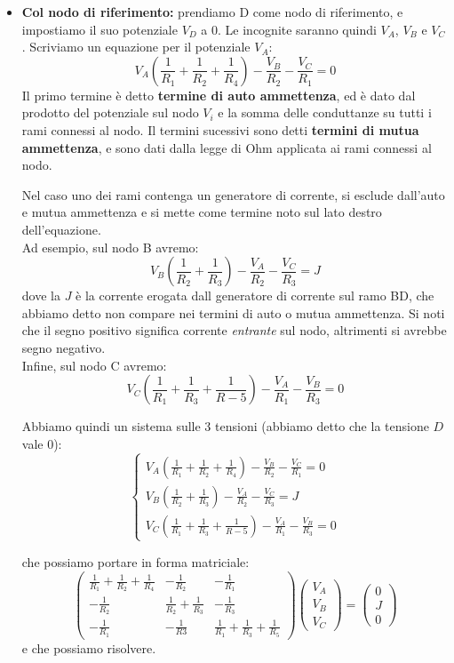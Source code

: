 \documentclass[a4paper,11pt]{article}
\begin{document}
\begin{itemize}
	\item \textbf{Col nodo di riferimento:} prendiamo D come nodo di riferimento, e impostiamo il suo potenziale $V_D$ a $0$. 
Le incognite saranno quindi $V_A$, $V_B$ e $V_C$.
Scriviamo un equazione per il potenziale $V_A$:
$$ V_A\left( \frac{1}{R_1} + \frac{1}{R_2} + \frac{1}{R_4} \right) - \frac{V_B}{R_2} - \frac{V_C}{R_1} = 0 $$
Il primo termine è detto \textbf{termine di auto ammettenza}, ed è dato dal prodotto del potenziale sul nodo $V_i$ e la somma delle conduttanze su tutti i rami connessi al nodo.
Il termini sucessivi sono detti \textbf{termini di mutua ammettenza}, e sono dati dalla legge di Ohm applicata ai rami connessi al nodo.

Nel caso uno dei rami contenga un generatore di corrente, si esclude dall'auto e mutua ammettenza e si mette come termine noto sul lato destro dell'equazione. \\
Ad esempio, sul nodo B avremo:
$$ V_B \left( \frac{1}{R_2} + \frac{1}{R_3} \right) - \frac{V_A}{R_2} - \frac{V_C}{R_3} = J $$
dove la $J$ è la corrente erogata dall generatore di corrente sul ramo BD, che abbiamo detto non compare nei termini di auto o mutua ammettenza. 
Si noti che il segno positivo significa corrente \textit{entrante} sul nodo, altrimenti si avrebbe segno negativo. \\
Infine, sul nodo C avremo:
$$ V_C \left( \frac{1}{R_1} + \frac{1}{R_3} + \frac{1}{R-5} \right) - \frac{V_A}{R_1} - \frac{V_B}{R_3} = 0 $$

Abbiamo quindi un sistema sulle 3 tensioni (abbiamo detto che la tensione $D$ vale 0):
\[
	\begin{cases}
 V_A\left( \frac{1}{R_1} + \frac{1}{R_2} + \frac{1}{R_4} \right) - \frac{V_B}{R_2} - \frac{V_C}{R_1} = 0 \\ 
 V_B \left( \frac{1}{R_2} + \frac{1}{R_3} \right) - \frac{V_A}{R_2} - \frac{V_C}{R_3} = J \\
 V_C \left( \frac{1}{R_1} + \frac{1}{R_3} + \frac{1}{R-5} \right) - \frac{V_A}{R_1} - \frac{V_B}{R_3} = 0 
	\end{cases}
\]

che possiamo portare in forma matriciale:
$$
\begin{pmatrix}
	\frac{1}{R_1} + \frac{1}{R_2} + \frac{1}{R_4} & -\frac{1}{R_2} & -\frac{1}{R_1} \\
	-\frac{1}{R_2} & \frac{1}{R_2} + \frac{1}{R_3} & -\frac{1}{R_3} \\
	-\frac{1}{R_1} & -\frac{1}{R3} & \frac{1}{R_1} + \frac{1}{R_3} + \frac{1}{R_5}
\end{pmatrix}
\begin{pmatrix}
V_A \\ V_B \\ V_C
\end{pmatrix}
=
\begin{pmatrix}
0 \\ J \\ 0
\end{pmatrix}
$$
e che possiamo risolvere.


\end{itemize}
\end{document}
